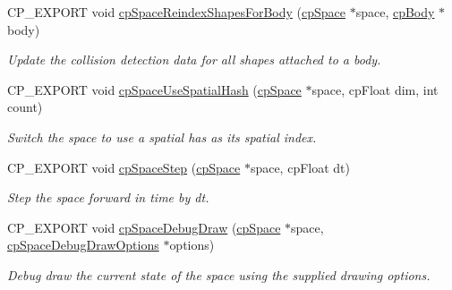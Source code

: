 \begin{DoxyCompactItemize}
\mbox{\label{group__cpSpace_ga9a141b9c927102b02a84bb2b8631f803}} 
C\+P\+\_\+\+E\+X\+P\+O\+RT void \hyperlink{group__cpSpace_ga9a141b9c927102b02a84bb2b8631f803}{cp\+Space\+Reindex\+Shapes\+For\+Body} (\hyperlink{structcpSpace}{cp\+Space} $\ast$space, \hyperlink{structcpBody}{cp\+Body} $\ast$body)
\begin{DoxyCompactList}\small\item\em Update the collision detection data for all shapes attached to a body. \end{DoxyCompactList}\item 
\mbox{\label{group__cpSpace_gaed394ccafade6346f25e9c78f92bc185}} 
C\+P\+\_\+\+E\+X\+P\+O\+RT void \hyperlink{group__cpSpace_gaed394ccafade6346f25e9c78f92bc185}{cp\+Space\+Use\+Spatial\+Hash} (\hyperlink{structcpSpace}{cp\+Space} $\ast$space, cp\+Float dim, int count)
\begin{DoxyCompactList}\small\item\em Switch the space to use a spatial has as it\textquotesingle{}s spatial index. \end{DoxyCompactList}\item 
\mbox{\label{group__cpSpace_gae87c828de2fe3709393ba94046212d80}} 
C\+P\+\_\+\+E\+X\+P\+O\+RT void \hyperlink{group__cpSpace_gae87c828de2fe3709393ba94046212d80}{cp\+Space\+Step} (\hyperlink{structcpSpace}{cp\+Space} $\ast$space, cp\+Float dt)
\begin{DoxyCompactList}\small\item\em Step the space forward in time by {\ttfamily dt}. \end{DoxyCompactList}\item 
\mbox{\label{group__cpSpace_ga02e8a34681aff3f29bd976e830f3b6da}} 
C\+P\+\_\+\+E\+X\+P\+O\+RT void \hyperlink{group__cpSpace_ga02e8a34681aff3f29bd976e830f3b6da}{cp\+Space\+Debug\+Draw} (\hyperlink{structcpSpace}{cp\+Space} $\ast$space, \hyperlink{structcpSpaceDebugDrawOptions}{cp\+Space\+Debug\+Draw\+Options} $\ast$options)
\begin{DoxyCompactList}\small\item\em Debug draw the current state of the space using the supplied drawing options. \end{DoxyCompactList}\end{DoxyCompactItemize}


